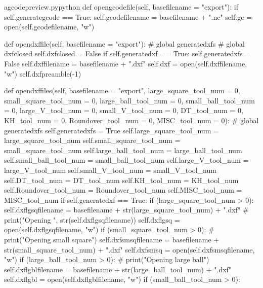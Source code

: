 \documentclass{ltxdoc}
\begin{document}
\lstset{firstnumber=\thegcpy}
\begin{writecode}{a}{gcodepreview.py}{python}
    def opengcodefile(self, basefilename = "export"):
        if self.generategcode == True:
            self.gcodefilename = basefilename + ".nc"
            self.gc = open(self.gcodefilename, "w")

    def opendxffile(self, basefilename = "export"): 
#        global generatedxfs
#        global dxfclosed
        self.dxfclosed = False
        if self.generatedxf == True:
            self.generatedxfs = False
            self.dxffilename = basefilename + ".dxf"
            self.dxf = open(self.dxffilename, "w")
            self.dxfpreamble(-1)

    def opendxffiles(self, basefilename = "export", 
                     large_square_tool_num = 0, 
                     small_square_tool_num = 0, 
                     large_ball_tool_num = 0,
                     small_ball_tool_num = 0,
                     large_V_tool_num = 0,
                     small_V_tool_num = 0,
                     DT_tool_num = 0,
                     KH_tool_num = 0,
                     Roundover_tool_num = 0,
                     MISC_tool_num = 0):
#        global generatedxfs
        self.generatedxfs = True
        self.large_square_tool_num = large_square_tool_num 
        self.small_square_tool_num = small_square_tool_num
        self.large_ball_tool_num = large_ball_tool_num
        self.small_ball_tool_num = small_ball_tool_num
        self.large_V_tool_num = large_V_tool_num
        self.small_V_tool_num = small_V_tool_num
        self.DT_tool_num = DT_tool_num
        self.KH_tool_num = KH_tool_num
        self.Roundover_tool_num = Roundover_tool_num
        self.MISC_tool_num = MISC_tool_num
        if self.generatedxf == True:
            if (large_square_tool_num > 0):
                self.dxflgsqfilename = basefilename + str(large_square_tool_num) + ".dxf"
#                print("Opening ", str(self.dxflgsqfilename))
                self.dxflgsq = open(self.dxflgsqfilename, "w")
            if (small_square_tool_num > 0):
#                print("Opening small square")
                self.dxfsmsqfilename = basefilename + str(small_square_tool_num) + ".dxf"
                self.dxfsmsq = open(self.dxfsmsqfilename, "w")
            if (large_ball_tool_num > 0):
#                print("Opening large ball")
                self.dxflgblfilename = basefilename + str(large_ball_tool_num) + ".dxf"
                self.dxflgbl = open(self.dxflgblfilename, "w")
            if (small_ball_tool_num > 0):

\end{writecode}
\end{document}
